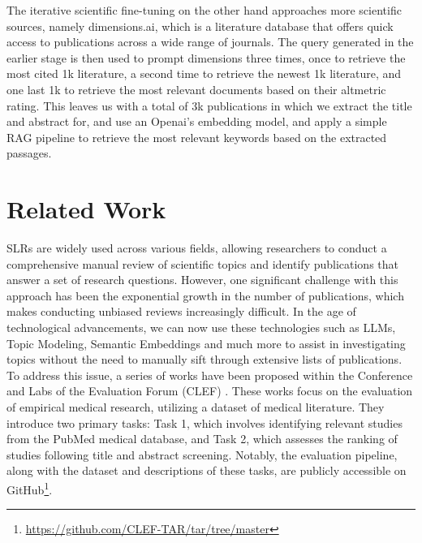 The iterative scientific fine-tuning on the other hand approaches more scientific sources, namely dimensions.ai, which is a literature database that offers quick access to publications across a wide range of journals. The query generated in the earlier stage is then used to prompt dimensions three times, once to retrieve the most cited 1k literature, a second time to retrieve the newest 1k literature, and one last 1k to retrieve the most relevant documents based on their altmetric rating. This leaves us with a total of 3k publications in which we extract the title and abstract for, and use an Openai's embedding model, and apply a simple RAG pipeline to retrieve the most relevant keywords based on the extracted passages.


\section{Related Work}\label{sec:relwork}

SLRs are widely used across various fields, allowing researchers to conduct a comprehensive manual review of scientific topics and identify publications that answer a set of research questions. However, one significant challenge with this approach has been the exponential growth in the number of publications, which makes conducting unbiased reviews increasingly difficult. In the age of technological advancements, we can now use these technologies such as LLMs, Topic Modeling, Semantic Embeddings and much more to assist in investigating topics without the need to manually sift through extensive lists of publications. To address this issue, a series of works have been proposed within the Conference and Labs of the Evaluation Forum (CLEF) \autocite{kanoulas2017clef, kanoulas2018clef, kanoulas2019clef}. These works focus on the evaluation of empirical medical research, utilizing a dataset of medical literature. They introduce two primary tasks: Task 1, which involves identifying relevant studies from the PubMed medical database, and Task 2, which assesses the ranking of studies following title and abstract screening. Notably, the evaluation pipeline, along with the dataset and descriptions of these tasks, are publicly accessible on GitHub\footnote{\url{https://github.com/CLEF-TAR/tar/tree/master}}.

